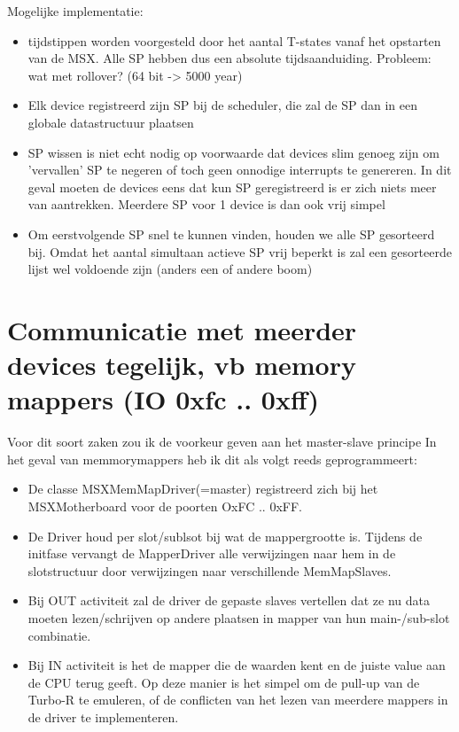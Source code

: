 \documentclass[11pt, a4paper]{report}
\begin{document}
Mogelijke implementatie: %
\begin{itemize}
\item tijdstippen worden voorgesteld door het aantal T-states vanaf het opstarten 
van de MSX. Alle SP hebben dus een absolute tijdsaanduiding. Probleem: wat 
met rollover? (64 bit -> 5000 year)
\item Elk device registreerd zijn SP bij de scheduler, die zal de SP dan in een 
globale datastructuur plaatsen
\item SP wissen is niet echt nodig op voorwaarde dat devices slim genoeg zijn om
'vervallen' SP te negeren of toch geen onnodige interrupts te genereren. In
dit geval moeten de devices eens dat kun SP geregistreerd is er zich niets 
meer van aantrekken. Meerdere SP voor 1 device is dan ook vrij simpel 
\item Om eerstvolgende SP snel te kunnen vinden, houden we alle SP gesorteerd bij.
Omdat het aantal simultaan actieve SP vrij beperkt is zal een gesorteerde
lijst wel voldoende zijn (anders een of andere boom)
\end{itemize}





\section{Communicatie met meerder devices tegelijk, 
vb memory mappers (IO 0xfc .. 0xff)}

Voor dit soort zaken zou ik de voorkeur geven aan het master-slave principe
In het geval van memmorymappers heb ik dit als volgt reeds geprogrammeert:
\begin{itemize}
\item De classe MSXMemMapDriver(=master) registreerd zich bij het MSXMotherboard voor de 
poorten OxFC .. 0xFF.
\item De Driver houd per slot/sublsot bij wat de mappergrootte is. Tijdens de initfase
vervangt de MapperDriver alle verwijzingen naar hem in de slotstructuur door verwijzingen 
naar verschillende MemMapSlaves.
\item Bij OUT activiteit zal de driver de gepaste slaves vertellen dat ze nu data moeten 
lezen/schrijven op andere plaatsen in mapper van hun main-/sub-slot combinatie.
\item Bij IN activiteit is het de mapper die de waarden kent en de juiste value aan de
CPU terug geeft. Op deze manier is het simpel om de pull-up van de Turbo-R te
emuleren, of de conflicten van het lezen van meerdere mappers in de driver te 
implementeren.
\end{itemize}
\end{document}
